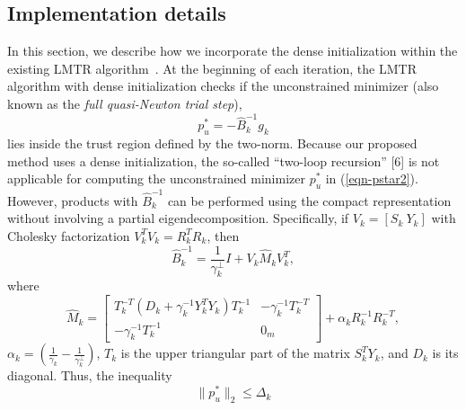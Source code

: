 \subsection{Implementation details} \label{sec-algorithm}
In this section, we describe how we incorporate the dense initialization
within the existing
{\small LMTR} algorithm~\cite{BurdakovLMTR16}.  
At the beginning of each iteration, the 
{\small LMTR} algorithm with dense initialization
checks if the
unconstrained minimizer 
(also known as the \emph{full quasi-Newton trial step}), 
\begin{equation}\label{eqn-pstar2}
p_u^* = - \hat{B}_k^{-1} g_k
\end{equation}
lies inside the trust region defined by the two-norm. 
Because our
proposed method uses a dense initialization, the
so-called ``two-loop recursion'' [6] is not applicable for computing
the unconstrained minimizer $p_u^*$ in (\ref{eqn-pstar2}).  
However, products with
$\hat{B}_k^{-1}$ can be performed using the compact representation
without involving a partial 
eigendecomposition. %
Specifically, if   $V_k = \left[S_k \ Y_k\right]$
with Cholesky factorization $V_k^TV_k = R_k^TR_k$, then
\begin{equation}\label{eqn-32}
\hat{B}_k^{-1} = \frac{1}{\gamma_k^{\perp}}I +
V_k \hat{M}_k V_k^T,
\end{equation}
where 
$$
\hat{M}_k =
\left[
\begin{matrix}
T_k^{-T}(D_k + \gamma_k^{-1}Y_k^TY_k)T_k^{-1} & -\gamma_k^{-1}T_k^{-T}\\
-\gamma_k^{-1}T_k^{-1} & 0_m
\end{matrix}
\right] + \alpha_k R_k^{-1} R_k^{-T},
$$
$\displaystyle \alpha_k = \left(\frac{1}{\gamma_k}
- \frac{1}{\gamma_k^{\perp}}\right)$, $T_k$ is the upper triangular
part of the matrix $S_k^TY_k$, and $D_k$ is its diagonal.
Thus, the inequality 
\begin{equation}\label{eqn-unconstrainedmin}
    \|p_u^*\|_2 \le \Delta_k
\end{equation}
